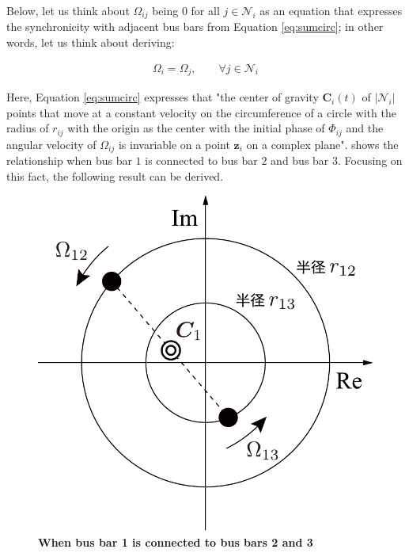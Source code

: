 \documentclass[tombow,dvipdfmx]{corona-a5-1.1}
\begin{document}
Below, let us think about $\Omega_{ij}$ being 0 for all $j\in \mathcal{N}_i$ as an equation that expresses the synchronicity with adjacent bus bars from Equation \ref{eq:sumcirc};
in other words, let us think about deriving: 

\begin{align}\label{eq:alloms}
\Omega_i = \Omega_{j} 
,\qquad 
\forall j\in \mathcal{N}_i
\end{align}

Here, Equation \ref{eq:sumcirc} expresses that "the center of gravity $\bm{C}_i (t)$ of $|\mathcal{N}_i|$ points that move at a constant velocity on the circumference of a circle with the radius of $r_{ij}$ with the origin as the center with the initial phase of $\Phi_{ij}$ and the angular velocity of $\Omega_{ij}$ is invariable on a point $\bm{z}_i$ on a complex plane".
 shows the relationship when bus bar $1$ is connected to bus bar $2$ and bus bar $3$. Focusing on this fact, the following result can be derived.

\begin{figure}[t]
\centering
\includegraphics[width = .4\linewidth]{figs/centerg}
\medskip
\caption{\textbf{When bus bar 1 is connected to bus bars 2 and 3}}
\label{fig:centerg}
\medskip
\end{figure}
\end{document}
